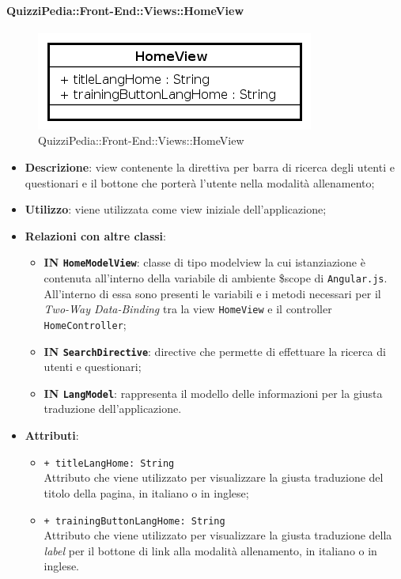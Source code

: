 \paragraph{QuizziPedia::Front-End::Views::HomeView}
\begin{figure} [ht]
	\centering
	\includegraphics[scale=0.80]{UML/Classi/Front-End/QuizziPedia_Front-end_Views_HomeView.png}
	\caption{QuizziPedia::Front-End::Views::HomeView}
\end{figure} \FloatBarrier
\begin{itemize}
	\item \textbf{Descrizione}: view contenente la direttiva per barra di ricerca degli utenti e questionari e il bottone che porterà l'utente nella modalità allenamento;
	\item \textbf{Utilizzo}: viene utilizzata come view iniziale dell'applicazione;
	\item \textbf{Relazioni con altre classi}:
	\begin{itemize}
		\item \textbf{IN \texttt{HomeModelView}}: classe di tipo modelview la cui istanziazione è contenuta all'interno della variabile di ambiente \$scope di \texttt{Angular.js}. All'interno di essa sono presenti le variabili e i metodi necessari per il \textit{Two-Way Data-Binding} tra la view \texttt{HomeView} e il controller \texttt{HomeController};
		\item \textbf{IN \texttt{SearchDirective}}: directive che permette di effettuare la ricerca di utenti e questionari;
		\item \textbf{IN \texttt{LangModel}}: rappresenta il modello delle informazioni per la giusta traduzione dell'applicazione.
	\end{itemize}
	\item \textbf{Attributi}:
	\begin{itemize}
		\item \texttt{+ titleLangHome: String} \\ Attributo che viene utilizzato per visualizzare la giusta traduzione del titolo della pagina, in italiano o in inglese;
		\item \texttt{+ trainingButtonLangHome: String} \\ Attributo che viene utilizzato per visualizzare la giusta traduzione della \textit{label} per il bottone di link alla modalità allenamento, in italiano o in inglese.
	\end{itemize}
\end{itemize}
	